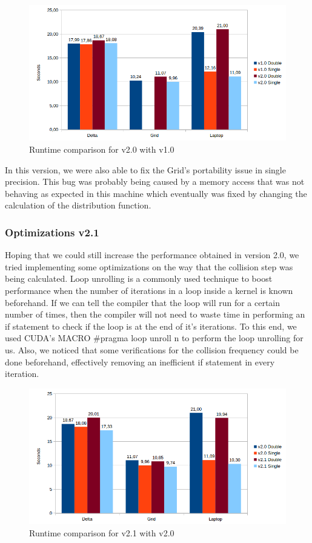 \documentclass[12pt]{book}
\begin{document}
  \begin{figure}[H]
  	\centering
  	\includegraphics[width=\linewidth]{Resources/Images/v2.png}
  	\caption{Runtime comparison for v2.0 with v1.0}
  	\label{fig:v2}
  \end{figure}
  

  In this version, we were also able to fix the Grid's portability issue in single precision. This bug was probably being caused by a memory access that was not behaving as expected in this machine which eventually was fixed by changing the calculation of the distribution function.

\subsubsection{Optimizations v2.1}
Hoping that we could still increase the performance obtained in version 2.0, we tried implementing some optimizations on the way that the collision step was being calculated. Loop unrolling is a commonly used technique to boost performance when the number of iterations in a loop inside a kernel is known beforehand. If we can tell the compiler that the loop will run for a certain number of times, then the compiler will not need to waste time in performing an if statement to check if the loop is at the end of it's iterations. To this end, we used CUDA's MACRO \#pragma loop unroll n to perform the loop unrolling for us. Also, we noticed that some verifications for the collision frequency could be done beforehand, effectively removing an inefficient if statement in every iteration.

  \begin{figure}[H]
  	\centering
  	\includegraphics[width=\linewidth]{Resources/Images/v21.png}
  	\caption{Runtime comparison for v2.1 with v2.0}
  	\label{fig:v21}
  \end{figure}
  
\end{document}
